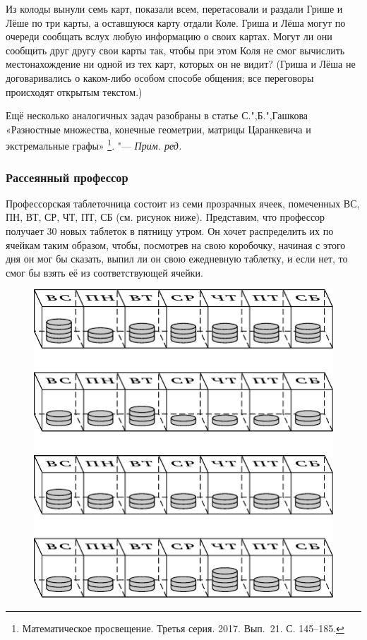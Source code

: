 \documentclass[twoside]{book}
\newenvironment{addedbytheeditors}{\par\medskip\small
}{\par\addvspace{\medskipamount}} %
\begin{document}
\begin{addedbytheeditors}
Из колоды вынули семь карт, показали всем, перетасовали и раздали Грише и Лёше
по три карты, а оставшуюся карту отдали Коле.
Гриша и Лёша могут по очереди сообщать вслух любую информацию о своих картах.
Могут ли они сообщить друг другу свои карты так, чтобы при этом Коля не смог
вычислить местонахождение ни одной из тех карт, которых он не видит?
(Гриша и Лёша не договаривались о каком-либо особом способе общения;
все переговоры происходят открытым текстом.)

Ещё несколько аналогичных задач разобраны в статье С.",Б.",Гашкова «Разностные множества, конечные геометрии, матрицы Царанкевича и экстремальные графы»%
\footnote{Математическое просвещение. Третья серия. 2017. Вып.~21. С. 145--185.}.
"--- \emph{Прим. ред.}  
\end{addedbytheeditors}

\subsubsection*{Рассеянный профессор}%

Профессорская таблеточница состоит из семи прозрачных ячеек, помеченных ВС, ПН, ВТ, СР, ЧТ, ПТ, СБ (см. рисунок ниже).
Представим, что профессор получает 30 новых таблеток в пятницу утром.
Он хочет распределить их по ячейкам таким образом, чтобы, посмотрев на свою коробочку, начиная с этого дня он мог бы сказать, выпил ли он свою ежедневную таблетку, и если нет, то смог бы взять её из соответствующей ячейки.

\begin{figure}[!ht]
\vspace{2\jot}
\centering
\includegraphics[scale=.9]{mp/wink-25}
\vspace{-2\jot}
\end{figure}
\end{document}
